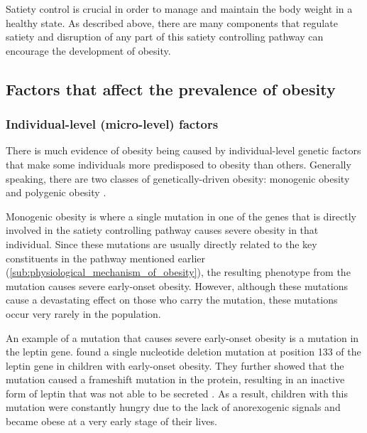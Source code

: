 Satiety control is crucial in order to manage  and maintain the body weight in a healthy state.
As described above, there are many components that regulate satiety and disruption of any part of this satiety controlling pathway can encourage the development of obesity.

\subsection{Factors that affect the prevalence of obesity}
\label{sub:factors_that_affect_the_prevalence_of_obesity}

\subsubsection{Individual-level (micro-level) factors}
\label{ssub:Individual-level_(micro-level)_factors}

There is much evidence of obesity being caused by individual-level genetic factors that make some individuals more predisposed to obesity than others.
Generally speaking, there are two classes of genetically-driven obesity: monogenic obesity and polygenic obesity \citep{Moustafa2013}.

Monogenic obesity is where a single mutation in one of the genes that is directly involved in the satiety controlling pathway causes severe obesity in that individual.
Since these mutations are usually directly related to the key constituents in the pathway mentioned earlier (\cref{sub:physiological_mechanism_of_obesity}), the resulting phenotype from the mutation causes severe early-onset obesity.
However, although these mutations cause a devastating effect on those who carry the mutation, these mutations occur very rarely in the population.

An example of a mutation that causes severe early-onset obesity is a mutation in the leptin gene.
\citet{Montague1997} found a single nucleotide deletion mutation at position 133 of the leptin gene in children with early-onset obesity.
They further showed that the mutation caused a frameshift mutation in the protein, resulting in an inactive form of leptin that was not able to be secreted \citep{Montague1997}.
As a result, children with this mutation were constantly hungry due to the lack of anorexogenic signals and became obese at a very early stage of their lives.

